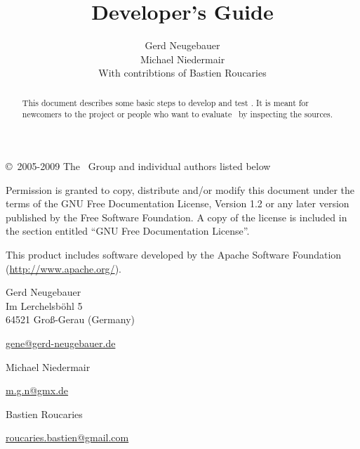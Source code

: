 \documentclass{extex-doc}
\begin{document}

\begin{titlepage}\parindent=0pt

  \title{Developer's Guide}
  \author{Gerd Neugebauer\\[2ex]%
    Michael Niedermair\\[2ex]%
    With contribtions of Bastien Roucaries}
  \maketitle

  \begin{center}
    \begin{abstract}\parindent=0pt
      This document describes some basic steps to develop and test
      \ExTeX.  It is meant for newcomers to the project or people who
      want to evaluate \ExTeX\ by inspecting the sources.
    \end{abstract}
  \end{center}
  \newpage
  \footnotesize
  \copyright\ 2005-2009 The \ExTeX\ Group and individual authors listed below
  \medskip

Permission is granted to copy, distribute and/or modify this document
under the terms of the GNU Free Documentation License, Version 1.2 or
any later version published by the Free Software Foundation. A copy of
the license is included in the section entitled ``GNU Free
Documentation License''.
\bigskip

This product includes software developed by the Apache Software
Foundation (\url{http://www.apache.org/}).

\vfill

Gerd Neugebauer\\
Im Lerchelsb\"ohl 5\\
64521 Gro\ss-Gerau (Germany)
\smallskip\par
\href{mailto://gene@gerd-neugebauer.de}{gene@gerd-neugebauer.de}
\bigskip

Michael Niedermair
\smallskip\par
\href{mailto://m.g.n@gmx.de}{m.g.n@gmx.de}
\bigskip

Bastien Roucaries
\smallskip\par
\href{mailto://roucaries.bastien@gmail.com}{roucaries.bastien@gmail.com}

\end{titlepage}

\tableofcontents
\newpage
\end{document}
